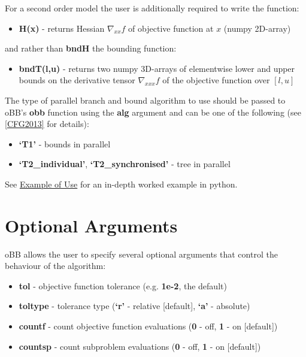 \documentclass[letterpaper,11pt,openany,oneside]{sphinxmanual}
\begin{document}
For a second order model the user is additionally required to write the function:
\begin{itemize}
\item {} 
\textbf{H(x)} - returns Hessian $\nabla_{xx} f$ of objective function at $x$ (numpy 2D-array)

\end{itemize}

and rather than \textbf{bndH} the bounding function:
\begin{itemize}
\item {} 
\textbf{bndT(l,u)} - returns two numpy 3D-arrays of elementwise lower and upper bounds on the derivative tensor $\nabla_{xxx} f$ of the objective function over $[l,u]$

\end{itemize}

The type of parallel branch and bound algorithm to use should be passed to oBB's \textbf{obb} function using the \textbf{alg} argument and can be one of the following (see {\hyperref[userguide:cfg2013]{{[}CFG2013{]}}} for details):
\begin{itemize}
\item {} 
\textbf{`T1'} - bounds in parallel

\item {} 
\textbf{`T2\_individual'}, \textbf{`T2\_synchronised'} - tree in parallel

\end{itemize}

See {\hyperref[userguide:example-of-use]{Example of Use}} for an in-depth worked example in python.


\section{Optional Arguments}
\label{userguide:optional-arguments}
oBB allows the user to specify several optional arguments that control the behaviour of the algorithm:
\begin{itemize}
\item {} 
\textbf{tol} - objective function tolerance (e.g. \textbf{1e-2}, the default)

\item {} 
\textbf{toltype} - tolerance type (\textbf{`r'} - relative {[}default{]}, \textbf{`a'} - absolute)

\item {} 
\textbf{countf} - count objective function evaluations (\textbf{0} - off, \textbf{1} - on {[}default{]})

\item {} 
\textbf{countsp} - count subproblem evaluations (\textbf{0} - off, \textbf{1} - on {[}default{]})

\end{itemize}
\end{document}
